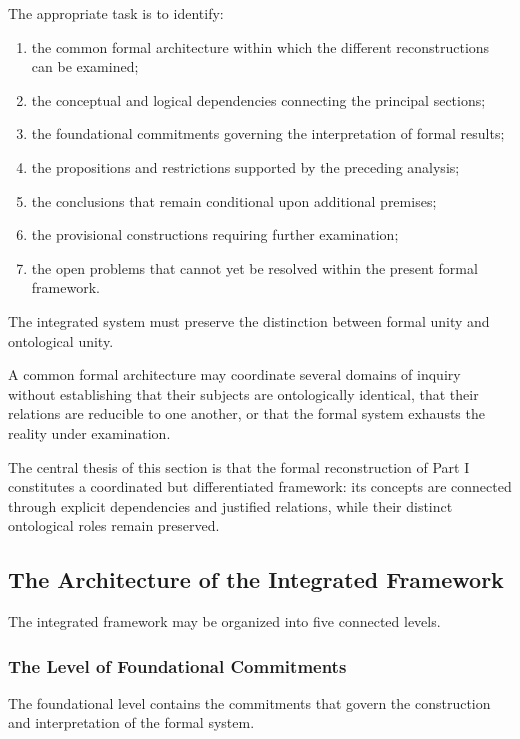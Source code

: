 The appropriate task is to identify:

\begin{enumerate}
    \item the common formal architecture within which
    the different reconstructions can be examined;
    \item the conceptual and logical dependencies
    connecting the principal sections;
    \item the foundational commitments governing
    the interpretation of formal results;
    \item the propositions and restrictions supported
    by the preceding analysis;
    \item the conclusions that remain conditional
    upon additional premises;
    \item the provisional constructions requiring
    further examination;
    \item the open problems that cannot yet be
    resolved within the present formal framework.
\end{enumerate}

The integrated system must preserve the distinction
between formal unity and ontological unity.

A common formal architecture may coordinate
several domains of inquiry without establishing
that their subjects are ontologically identical,
that their relations are reducible to one another,
or that the formal system exhausts the reality
under examination.

The central thesis of this section is that the
formal reconstruction of Part I constitutes
a coordinated but differentiated framework:
its concepts are connected through explicit
dependencies and justified relations, while
their distinct ontological roles remain preserved.

\subsection{The Architecture of the Integrated Framework}

The integrated framework may be organized
into five connected levels.

\subsubsection{The Level of Foundational Commitments}

The foundational level contains the commitments
that govern the construction and interpretation
of the formal system.

